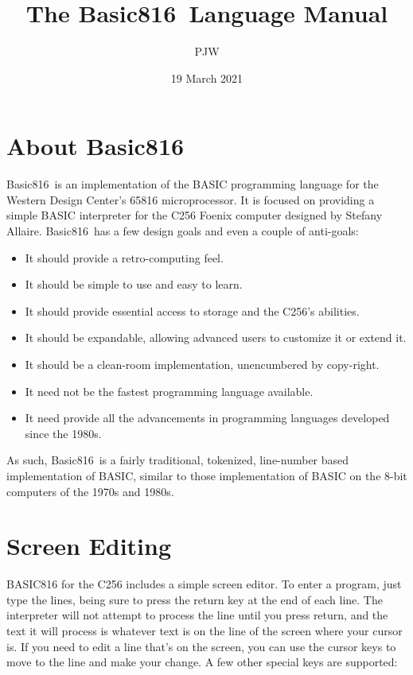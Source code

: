 \documentclass{report}
\begin{document}
    \newcommand{\BASIC}[0]{{\sc Basic816}}
    \newcommand{\keyword}[1]{{\tt {#1}}}
    \newcommand{\param}[1]{{\tt <{#1}>}}
    \title{The \BASIC\  Language Manual}
    \author{PJW}
    \date{19 March 2021}
    \maketitle

    \section*{About \BASIC}

    \BASIC\ is an implementation of the BASIC programming language for the Western Design Center's 65816 microprocessor.
    It is focused on providing a simple BASIC interpreter for the C256 Foenix computer designed by Stefany Allaire.
    \BASIC\ has a few design goals and even a couple of anti-goals:

    \begin{itemize}
        \item It should provide a retro-computing feel.
        \item It should be simple to use and easy to learn.
        \item It should provide essential access to storage and the C256's abilities.
        \item It should be expandable, allowing advanced users to customize it or extend it.
        \item It should be a clean-room implementation, unencumbered by copy-right. 
        \item It need not be the fastest programming language available.
        \item It need provide all the advancements in programming languages developed since the 1980s.
    \end{itemize}

    As such, \BASIC\ is a fairly traditional, tokenized, line-number based implementation of BASIC, similar to those
    implementation of BASIC on the 8-bit computers of the 1970s and 1980s.

    \section*{Screen Editing}

    BASIC816 for the C256 includes a simple screen editor.
    To enter a program, just type the lines, being sure to press the return key at the end of each line.
    The interpreter will not attempt to process the line until you press return, and the text it will process
    is whatever text is on the line of the screen where your cursor is.
    If you need to edit a line that's on the screen, you can use the cursor keys to move to the line and make your change.
    A few other special keys are supported:
\end{document}
